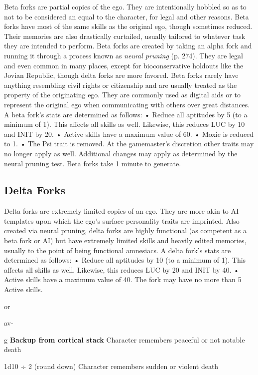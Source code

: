 Beta forks are partial copies of the ego. They are 
intentionally hobbled so as to not to be considered 
an equal to the character, for legal and other reasons. 
Beta forks have most of the same skills as the original 
ego, though sometimes reduced. Their memories are 
also drastically curtailed, usually tailored to whatever 
task they are intended to perform.
Beta forks are created by taking an alpha fork and 
running it through a process known as \textit{neural pruning} 
(p. 274). They are legal and even common in many 
places, except for bioconservative holdouts like the 
Jovian Republic, though delta forks are more favored. 
Beta forks rarely have anything resembling civil rights 
or citizenship and are usually treated as the property 
of the originating ego. They are commonly used as 
digital aids or to represent the original ego when communicating
with others over great distances.
A beta fork's stats are determined as follows:
•  Reduce all aptitudes by 5 (to a minimum of 1). 
This affects all skills as well. Likewise, this reduces
LUC by 10 and INIT by 20.
•  Active skills have a maximum value of 60.
•  Moxie is reduced to 1.
• The Psi trait is removed. At the gamemaster's discretion
other traits may no longer apply as well.
Additional changes may apply as determined by 
the neural pruning test. Beta forks take 1 minute 
to generate.

\subsection{Delta Forks}

Delta forks are extremely limited copies of an ego. 
They are more akin to AI templates upon which 
the ego's surface personality traits are imprinted. 
Also created via neural pruning, delta forks are 
highly functional (as competent as a beta fork or 
AI) but have extremely limited skills and heavily
edited memories, usually to the point of being
functional amnesiacs.
A delta fork's stats are determined as follows:
•  Reduce all aptitudes by 10 (to a minimum of 1). 
This affects all skills as well. Likewise, this reduces
LUC by 20 and INIT by 40.
•  Active skills have a maximum value of 40. The 
fork may have no more than 5 Active skills.

or 

av-

g
\textbf{Backup from cortical stack}
Character remembers peaceful or not notable death

1d10 ÷ 2 (round down)
Character remembers sudden or violent death


